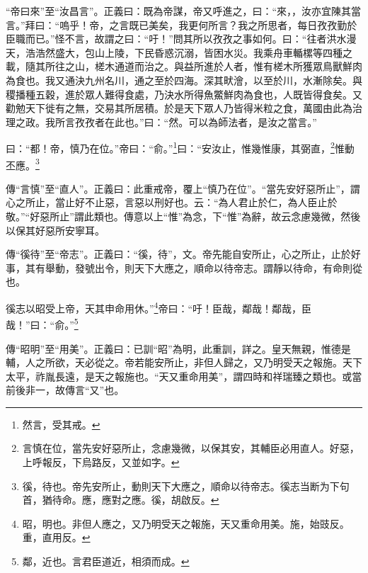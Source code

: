 {\noindent\shu{}\fzkt “帝曰來”至“汝昌言”。正義曰：既為帝謀，帝又呼進之，曰：“來，，汝亦宜陳其當言。”拜曰：“嗚乎！帝，之言既已美矣，我更何所言？我之所思者，每日孜孜勤於臣職而已。”怪不言，故謂之曰：“吁！”問其所以孜孜之事如何。曰：“往者洪水漫天，浩浩然盛大，包山上陵，下民昏惑沉溺，皆困水災。我乘舟車輴樏等四種之載，隨其所往之山，槎木通道而治之。與益所進於人者，惟有槎木所獲眾鳥獸鮮肉為食也。我又通決九州名川，通之至於四海。深其畎澮，以至於川，水漸除矣。與稷播種五穀，進於眾人難得食處，乃決水所得魚鱉鮮肉為食也，人既皆得食矣。又勸勉天下徙有之無，交易其所居積。於是天下眾人乃皆得米粒之食，萬國由此為治理之政。我所言孜孜者在此也。”曰：“然。可以為師法者，是汝之當言。” \par}

曰：“都！帝，慎乃在位。”帝曰：“俞。”\footnote{然言，受其戒。}曰：“安汝止，惟幾惟康，其弼直，\footnote{言慎在位，當先安好惡所止，念慮幾微，以保其安，其輔臣必用直人。好惡，上呼報反，下烏路反，又並如字。}惟動丕應。\footnote{徯，待也。帝先安所止，動則天下大應之，順命以待帝志。徯志当断为下句首，猶待命。應，應對之應。徯，胡啟反。}


{\noindent\zhuan{}\fzbyks 傳“言慎”至“直人”。正義曰：此重戒帝，覆上“慎乃在位”。“當先安好惡所止”，謂心之所止，當止好不止惡，言惡以刑好也。云：“為人君止於仁，為人臣止於敬。”“好惡所止”謂此類也。傳意以上“惟”為念，下“惟”為辭，故云念慮幾微，然後以保其好惡所安寧耳。 \par}

{\noindent\zhuan{}\fzbyks 傳“徯待”至“帝志”。正義曰：“徯，待”，文。帝先能自安所止，心之所止，止於好事，其有舉動，發號出令，則天下大應之，順命以待帝志。謂靜以待命，有命則從也。 \par}

徯志以昭受上帝，天其申命用休。”\footnote{昭，明也。非但人應之，又乃明受天之報施，天又重命用美。施，始豉反。重，直用反。}帝曰：“吁！臣哉，鄰哉！鄰哉，臣哉！”曰：“俞。”\footnote{鄰，近也。言君臣道近，相須而成。}

{\noindent\zhuan{}\fzbyks 傳“昭明”至“用美”。正義曰：已訓“昭”為明，此重訓，詳之。皇天無親，惟德是輔，人之所欲，天必從之。帝若能安所止，非但人歸之，又乃明受天之報施。天下太平，祚胤長遠，是天之報施也。“天又重命用美”，謂四時和祥瑞臻之類也。或當前後非一，故傳言“又”也。 \par}

